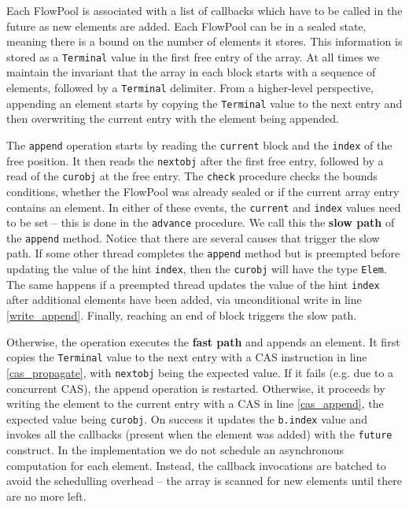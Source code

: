 \documentclass[runningheads,a4paper]{llncs}
\begin{document}
Each FlowPool is associated with a list of callbacks which have
to be called in the future as new elements are added.
Each FlowPool can be in a sealed state, meaning there is a bound on
the number of elements it stores.
This information is stored as a \verb=Terminal= value in the first
free entry of the array.
At all times we maintain the invariant that the array in each block
starts with a sequence of elements, followed by a \verb=Terminal=
delimiter. From a higher-level perspective, appending an element
starts by copying the \verb=Terminal= value to the next entry and then
overwriting the current entry with the element being appended.

The \verb=append= operation starts by reading the \verb=current= block
and the \verb=index= of the free position.
It then reads the
\verb=nextobj= after the first free entry, followed by a read of the
\verb=curobj= at the free entry.
The \verb=check= procedure checks the bounds conditions, whether the
FlowPool was already sealed or if the current array entry contains an
element.
In either of these events, the \verb=current= and \verb=index= values
need to be set -- this is done in the \verb=advance= procedure.
We call this the \textbf{slow path} of the \verb=append= method.
Notice that there are several causes that trigger the slow path.
If some other thread completes the \verb=append= method but is
preempted before updating the value of the hint \verb=index=, then the
\verb=curobj= will have the type \verb=Elem=.
The same happens if a preempted thread updates the value of the
hint \verb=index= after additional elements have been added,
via unconditional write in line \ref{write_append}.
Finally, reaching an end of block triggers the slow path.

Otherwise, the operation executes the \textbf{fast path} and appends
an element.
It first copies the \verb=Terminal= value to the next entry with a CAS
instruction in line \ref{cas_propagate}, with \verb=nextobj= being the
expected value. If it fails (e.g. due to a concurrent CAS), the append
operation is restarted.
Otherwise, it proceeds by writing the element to the current entry with
a CAS in line \ref{cas_append}, the expected value being
\verb=curobj=.
On success it updates the \verb=b.index= value and invokes all
the callbacks (present when the element was added) with
the \verb=future= construct.
In the implementation we do not schedule an asynchronous
computation for each element.
Instead, the callback invocations are batched to avoid the schedulling overhead
-- the array is scanned for new elements
until there are no more left.
\end{document}
